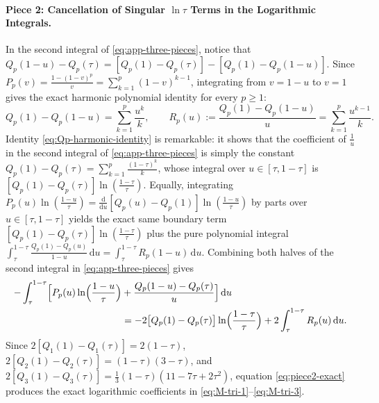 \documentclass[11pt,reqno]{amsart}
\theoremstyle{definition}
\theoremstyle{remark}
\numberwithin{equation}{section}
\newcommand{\dd}{\mathrm{d}}
\begin{document}
\paragraph{\textbf{Piece 2: Cancellation of Singular $\ln\tau$ Terms in the Logarithmic Integrals.}}
In the second integral of \eqref{eq:app-three-pieces}, notice that $Q_p(1-u) - Q_p(\tau) = [Q_p(1) - Q_p(\tau)] - [Q_p(1) - Q_p(1-u)]$. Since $P_p(v) = \frac{1-(1-v)^p}{v} = \sum_{k=1}^p (1-v)^{k-1}$, integrating from $v = 1-u$ to $v = 1$ gives the exact harmonic polynomial identity for every $p \ge 1$:
\begin{equation}\label{eq:Qp-harmonic-identity}
Q_p(1) - Q_p(1-u) = \sum_{k=1}^p \frac{u^k}{k}, \qquad R_p(u) := \frac{Q_p(1) - Q_p(1-u)}{u} = \sum_{k=1}^p \frac{u^{k-1}}{k}.
\end{equation}
Identity \eqref{eq:Qp-harmonic-identity} is remarkable: it shows that the coefficient of $\frac{1}{u}$ in the second integral of \eqref{eq:app-three-pieces} is simply the constant $Q_p(1) - Q_p(\tau) = \sum_{k=1}^p \frac{(1-\tau)^k}{k}$, whose integral over $u \in [\tau,1-\tau]$ is $[Q_p(1)-Q_p(\tau)]\ln(\frac{1-\tau}{\tau})$. Equally, integrating $P_p(u)\ln(\frac{1-u}{\tau}) = \frac{\dd}{\dd u}[Q_p(u) - Q_p(1)]\ln(\frac{1-u}{\tau})$ by parts over $u \in [\tau,1-\tau]$ yields the exact same boundary term $[Q_p(1) - Q_p(\tau)]\ln(\frac{1-\tau}{\tau})$ plus the pure polynomial integral $\int_\tau^{1-\tau} \frac{Q_p(1)-Q_p(u)}{1-u}\,\dd u = \int_\tau^{1-\tau} R_p(1-u)\,\dd u$. Combining both halves of the second integral in \eqref{eq:app-three-pieces} gives
\begin{equation}\label{eq:piece2-exact}
\begin{aligned}
-\int_{\tau}^{1-\tau} \Bigl[P_p(u)\ln\Bigl(\frac{1-u}{\tau}\Bigr) &+ \frac{Q_p(1-u) - Q_p(\tau)}{u}\Bigr]\,\dd u \\
&= -2\bigl[Q_p(1)-Q_p(\tau)\bigr]\ln\Bigl(\frac{1-\tau}{\tau}\Bigr) + 2\int_{\tau}^{1-\tau} R_p(u)\,\dd u.
\end{aligned}
\end{equation}
Since $2[Q_1(1)-Q_1(\tau)] = 2(1-\tau)$, $2[Q_2(1)-Q_2(\tau)] = (1-\tau)(3-\tau)$, and $2[Q_3(1)-Q_3(\tau)] = \frac{1}{3}(1-\tau)(11 - 7\tau + 2\tau^2)$, equation \eqref{eq:piece2-exact} produces the exact logarithmic coefficients in \eqref{eq:M-tri-1}--\eqref{eq:M-tri-3}.
\end{document}
